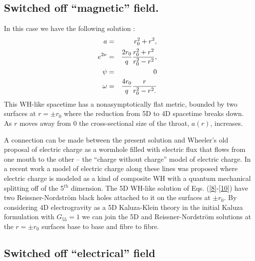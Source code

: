 \subsection{Switched off ``magnetic'' field.} 

In this case we have the following solution \cite{chodos} \cite{dzh1}: 
\begin{eqnarray}
a & = & r^{2}_{0} + r^{2},
\label{8}\\
e^{2\nu } & = & {2r_{0}\over q}{r^{2}_{0}+r^{2}
\over r^{2}_{0}-r^{2}},
\label{9}\\
\psi &=& 0
\label{9a}\\
\omega & = & 4r_{0}\over q}
{r\over {r^{2}_{0} - r^{2}}.
\label{10}
\end{eqnarray}
This WH-like spacetime has a nonasymptotically flat metric, 
bounded by two surfaces at $r=\pm r_0$ where the
reduction from 5D to 4D spacetime breaks down. As $r$ moves
away from $0$ the cross-sectional size of the throat, $a(r)$, 
increases. 

A connection can be made between the present solution and 
Wheeler's old proposal of electric charge as a wormhole filled
with electric flux that flows from one mouth to the other --
the ``charge without charge'' model of electric charge. 
In a recent work \cite{dzh3} a model of electric charge 
along these lines was proposed where electric charge is 
modeled as a kind of composite WH with a 
quantum mechanical splitting off of the 5$^{th}$ dimension. 
The 5D WH-like solution of Eqs. (\ref{8}-\ref{10}) 
have two Reissner-Nordstr\"om black holes attached to
it on the surfaces at $\pm r_0$. By considering 4D electrogravity
as a 5D Kaluza-Klein theory in the initial Kaluza formulation 
with $G_{55}=1$ we can join the 5D and Reissner-Nordstr\"om 
solutions at the $r=\pm r_0$ surfaces base to base and 
fibre to fibre.

\subsection{Switched off ``electrical'' field}

